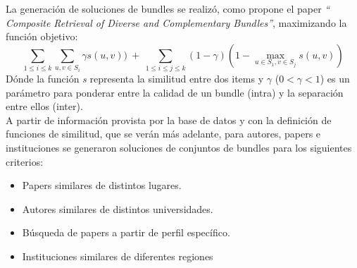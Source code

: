 La generación de soluciones de bundles se realizó, como propone el paper \textit{\textquotedblleft 
Composite Retrieval of Diverse and Complementary Bundles\textquotedblright}, maximizando la función 
objetivo: $$\displaystyle\sum_{1 \leq i \leq k} \displaystyle\sum_{u,v \in S_{i}} \gamma s(u,v))\ 
+\ \displaystyle\sum_{1 \leq i \leq j \leq k} (1-\gamma) (1 - \displaystyle\max_{u \in S_{1}, v 
\in S_{j}} s(u,v))$$ Dónde la función \textit{s} representa la similitud entre dos items y 
$\gamma$ ($0 < \gamma < 1$) es un parámetro para ponderar entre la calidad de un bundle (intra) y 
la separación entre ellos (inter).\\
A partir de información provista por la base de datos y con la definición de funciones de 
similitud, que se verán más adelante, para autores, papers e instituciones se generaron soluciones de 
conjuntos de bundles para los siguientes criterios:
\begin{itemize}
 \item Papers similares de distintos lugares.
 \item Autores similares de distintos universidades.
 \item Búsqueda de papers a partir de perfil específico.
 \item Instituciones similares de diferentes regiones
\end{itemize}
